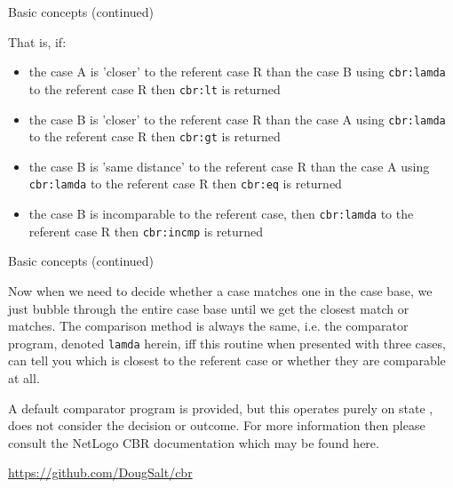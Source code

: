 \documentclass[usenames,dvipsnames,10pt]{beamer} %
\begin{document}
\begin{frame}{Basic concepts (continued)}

    That is, if: 

    \begin{itemize}
        \item the case A is 'closer' to the referent case R than the case B
            using {\color{blue}\texttt{cbr:lamda}}  to the referent case R then
            {\color{blue}\texttt{cbr:lt}} is returned
        \item the case B is 'closer' to the referent case R than the case A
            using {\color{blue}\texttt{cbr:lamda}}  to the referent case R then
            {\color{blue}\texttt{cbr:gt}} is returned
        \item the case B is 'same distance' to the referent case R than the
            case A using {\color{blue}\texttt{cbr:lamda}}  to the referent case
            R then {\color{blue}\texttt{cbr:eq}} is returned
        \item the case B is incomparable to the referent case, then
            {\color{blue}\texttt{cbr:lamda}}  to the referent case R then
            {\color{blue}\texttt{cbr:incmp}} is returned
    \end{itemize}

\end{frame}

\begin{frame}{Basic concepts (continued)}

    Now when we need to decide whether a case matches one in the case base, we
    just bubble through the entire case base until we get the closest match or
    matches. The comparison method is always the same, i.e. the comparator
    program, denoted {\color{blue}\texttt{lamda}} herein, iff this routine when
    presented with three cases, can tell you which is closest to the referent
    case or whether they are comparable at all.

    \vspace{0.25cm}
    A default comparator program is provided, but this operates purely on state
    , does not consider the decision or outcome. For more information then
    please consult the NetLogo CBR documentation which may be found here.

    \vspace{0.25cm}
    \url{https://github.com/DougSalt/cbr}


\end{frame}
\end{document}
